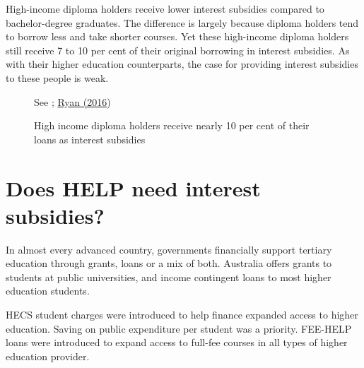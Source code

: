 \documentclass[embargoed]{grattan}
\begin{document}
High-income diploma holders receive lower interest subsidies compared to bachelor-degree graduates. The difference is largely because diploma holders tend to borrow less and take shorter courses. Yet these high-income diploma holders still receive 7 to 10 per cent of their original borrowing in interest subsidies. As with their higher education counterparts, the case for providing interest subsidies to these people is weak.

\begin{figure}
\caption{High income diploma holders receive nearly 10 per cent of their loans as interest subsidies}\label{fig:fig11-high-income-dip-holders-receive-nearly-10pc-loans-as-interest-subsides}

{See ; \protect\hyperlink{_ENREF_71}{Ryan (2016})}
\end{figure}

\chapter{Does HELP need interest subsidies?}\label{chap:does-help-need-interest-subsidies}

In almost every advanced country, governments financially support tertiary education through grants, loans or a mix of both. Australia offers grants to students at public universities, and income contingent loans to most higher education students.

HECS student charges were introduced to help finance expanded access to higher education. Saving on public expenditure per student was a priority. FEE-HELP loans were introduced to expand access to full-fee courses in all types of higher education provider.
\end{document}
